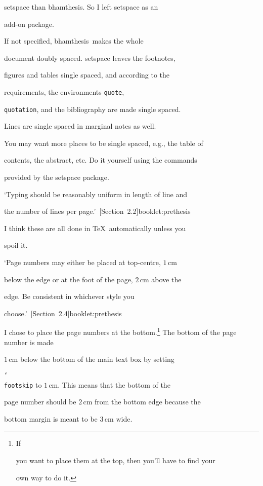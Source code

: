 \documentclass{bhamthesis}
\makeatletter
\renewcommand{\cite}{\@ifstar{\@ifstar{\HAR@acite}{\HAR@fcite}}{\HAR@acite}}
\newcommand{\cm}{\mathrm{cm}}
\newcommand{\solnmark}{\textasteriskcentered}
\newcommand{\req}{\begin{singlespace}\small\item}
\newcommand{\soln}{\end{singlespace}\normalsize\item[\solnmark]}
\newcommand{\clsname}{\pkg{bhamthesis}}
\newcommand{\bksl}{\char`\\}
\newcommand{\cmd}[1]{\texttt{\bksl{}#1}}
\newcommand{\pkg}[1]{\textsf{#1}}
\newcommand{\env}[1]{\texttt{#1}}
\makeatother
\begin{document}
\begin{itemize}
{  \pkg{setspace} than \clsname.  So I left \pkg{setspace} as an

  add-on package.}  If not specified, \clsname\ makes the whole

  document doubly spaced.  \pkg{setspace} leaves the footnotes,

  figures and tables single spaced, and according to the

  requirements, the environments \env{quote},

  \env{quotation}, and the bibliography are made single spaced.

  Lines are single spaced in marginal notes as well.

  You may want more places to be single spaced, e.g., the table of

  contents, the abstract, etc.  Do it yourself using the commands

  provided by the \pkg{setspace} package.



\req `Typing should be reasonably uniform in length of line and

  the number of lines per page.'~\cite[Section~2.2]{booklet:prethesis}

\soln I think these are all done in \TeX\ automatically unless you

  spoil it.



\req `Page numbers may either be placed at top-centre, $1\,\cm$

  below the edge or at the foot of the page, $2\,\cm$ above the

  edge.  Be consistent in whichever style you

  choose.'~\cite[Section~2.4]{booklet:prethesis}

\soln I chose to place the page numbers at the bottom.\footnote{If

  you want to place them at the top, then you'll have to find your

  own way to do it.}  The bottom of the page number is made

  $1\,\cm$ below the bottom of the main text box by setting

  \cmd{footskip} to $1\,\cm$.  This means that the bottom of the

  page number should be $2\,\cm$ from the bottom edge because the

  bottom margin is meant to be $3\,\cm$ wide.




\end{itemize}
\end{document}
